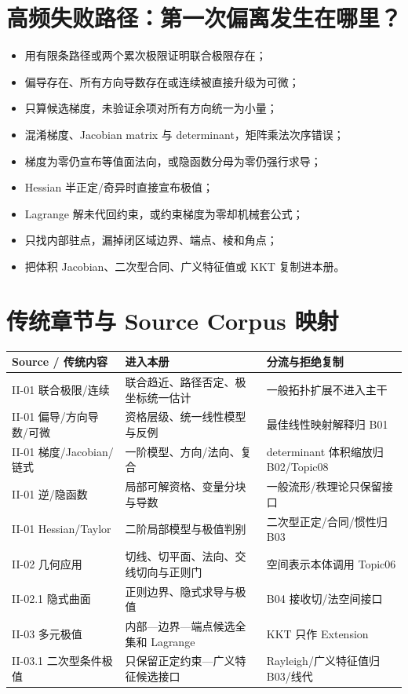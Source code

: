 \documentclass[11pt,a4paper,fontset=fandol]{ctexart}
\begin{document}
\section{高频失败路径：第一次偏离发生在哪里？}
\begin{itemize}
  \item 用有限条路径或两个累次极限证明联合极限存在；
  \item 偏导存在、所有方向导数存在或连续被直接升级为可微；
  \item 只算候选梯度，未验证余项对所有方向统一为小量；
  \item 混淆梯度、Jacobian matrix 与 determinant，矩阵乘法次序错误；
  \item 梯度为零仍宣布等值面法向，或隐函数分母为零仍强行求导；
  \item Hessian 半正定/奇异时直接宣布极值；
  \item Lagrange 解未代回约束，或约束梯度为零却机械套公式；
  \item 只找内部驻点，漏掉闭区域边界、端点、棱和角点；
  \item 把体积 Jacobian、二次型合同、广义特征值或 KKT 复制进本册。
\end{itemize}

\section{传统章节与 Source Corpus 映射}
\begin{longtable}{L{2.65cm}L{5.25cm}L{\dimexpr\linewidth-7.90cm\relax}}
\toprule
\textbf{Source / 传统内容} & \textbf{进入本册} & \textbf{分流与拒绝复制}\\
\midrule
II-01 联合极限/连续 & 联合趋近、路径否定、极坐标统一估计 & 一般拓扑扩展不进入主干\\
II-01 偏导/方向导数/可微 & 资格层级、统一线性模型与反例 & 最佳线性映射解释归 B01\\
II-01 梯度/Jacobian/链式 & 一阶模型、方向/法向、复合 & determinant 体积缩放归 B02/Topic08\\
II-01 逆/隐函数 & 局部可解资格、变量分块与导数 & 一般流形/秩理论只保留接口\\
II-01 Hessian/Taylor & 二阶局部模型与极值判别 & 二次型正定/合同/惯性归 B03\\
II-02 几何应用 & 切线、切平面、法向、交线切向与正则门 & 空间表示本体调用 Topic06\\
II-02.1 隐式曲面 & 正则边界、隐式求导与极值 & B04 接收切/法空间接口\\
II-03 多元极值 & 内部—边界—端点候选全集和 Lagrange & KKT 只作 Extension\\
II-03.1 二次型条件极值 & 只保留正定约束—广义特征候选接口 & Rayleigh/广义特征值归 B03/线代\\
\bottomrule
\end{longtable}
\end{document}
